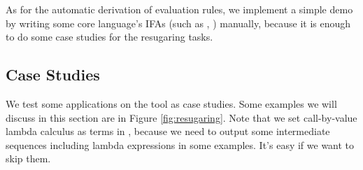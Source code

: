 As for the automatic derivation of evaluation rules, we implement a simple demo by writing some core language's IFAs (such as , ) manually, because it is enough to do some case studies for the resugaring tasks.

\subsection{Case Studies}



We test some applications on the tool as case studies. Some examples we will discuss in this section are in Figure \ref{fig:resugaring}. Note that we set call-by-value lambda calculus as terms in , because we need to output some intermediate sequences including lambda expressions in some examples. It's easy if we want to skip them.

